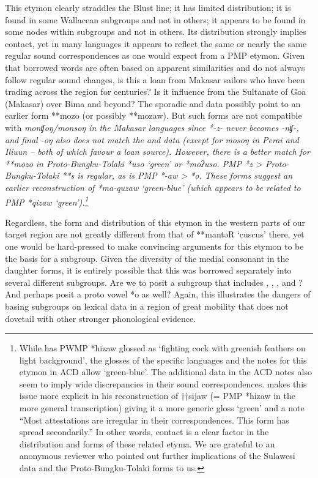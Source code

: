 This etymon clearly straddles the Blust line; it has limited
distribution; it is found in some Wallacean subgroups
and not in others; it appears to be found in some nodes within
subgroups and not in others.
Its distribution strongly implies contact,
yet in many languages it appears to reflect the same or nearly
the same regular sound correspondences as one would expect from a PMP etymon.
Given that borrowed words are often based on apparent similarities
and do not always follow regular sound changes,
is this a loan from Makasar sailors who have been trading across
the region for centuries? Is it influence from the Sultanate
of Goa (Makasar) over Bima
and beyond? 
The sporadic  and  data possibly
point to an earlier form **mozo (or possibly **mozaw).
But such forms are not compatible with \it{monʧoŋ/monsoŋ} in
the Makasar languages since *-z- never becomes \it{-nʧ-},
and final \it{-oŋ} also does not match the 
and  data (except for \it{mosoŋ} in Perai
and Ili{\Q}uun -- both of which favour a loan source).
However, there is a better match for **mozo in Proto-Bungku-Tolaki
*uso ‘green’ \citep[486]{Mead1998} or *moʔuso.
PMP *z > Proto-Bungku-Tolaki **s is regular,
as is PMP *-aw > *o.
These forms suggest an earlier reconstruction of *ma-quzaw ‘green-blue’
(which appears to be related to PMP *qizaw ‘green’).\footnote{
		While \citet{BlustTrussel2020} has PWMP *hizaw glossed as ‘fighting
		cock with greenish feathers on light background’,
		the glosses of the specific languages
		and the notes for this etymon in ACD allow ‘green-blue’.
		The additional data in the ACD notes also seem to imply wide
		discrepancies in their sound correspondences.
		\citet[982]{Wolff2010} makes this issue more explicit in his
		reconstruction of ††sijaw (= PMP *hizaw in the more general transcription)
		giving it a more generic gloss ‘green’
		and a note “Most attestations are irregular in their correspondences.
		This form has spread secondarily.” In other words,
		contact is a clear factor in the distribution
		and forms of these related etyma.
		We are grateful to an anonymous reviewer who pointed out further
		implications of the Sulawesi data
		and the Proto-Bungku-Tolaki forms to us.}

Regardless,
the form and distribution of this etymon in the western parts
of our target region are not greatly different from that of **mantəR
‘cuscus’ there, yet one would be hard-pressed to make convincing arguments for
this etymon to be the basis for a subgroup.
Given the diversity of the medial consonant in the daughter forms,
it is entirely possible that this was borrowed separately into several different subgroups.
Are we to posit a subgroup that includes ,
, ,  and ? And perhaps posit a proto vowel *o as well? Again,
this illustrates the dangers of basing subgroups on lexical data
in a region of great mobility that does not dovetail with other stronger phonological evidence.

